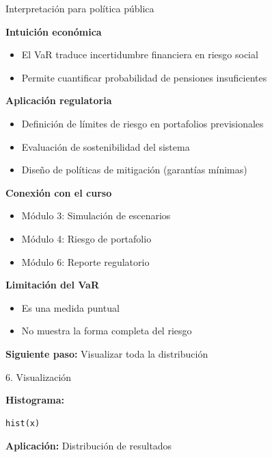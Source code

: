 \documentclass[10pt]{beamer}
\begin{document}
\begin{frame}{Interpretación para política pública}

\textbf{Intuición económica}

\begin{itemize}
\item El VaR traduce incertidumbre financiera en riesgo social
\item Permite cuantificar probabilidad de pensiones insuficientes
\end{itemize}

\vspace{0.4cm}

\textbf{Aplicación regulatoria}

\begin{itemize}
\item Definición de límites de riesgo en portafolios previsionales
\item Evaluación de sostenibilidad del sistema
\item Diseño de políticas de mitigación (garantías mínimas)
\end{itemize}

\vspace{0.4cm}

\textbf{Conexión con el curso}

\begin{itemize}
\item Módulo 3: Simulación de escenarios
\item Módulo 4: Riesgo de portafolio
\item Módulo 6: Reporte regulatorio
\end{itemize}

\textbf{Limitación del VaR}

\begin{itemize}
\item Es una medida puntual
\item No muestra la forma completa del riesgo
\end{itemize}

\vspace{0.3cm}

\textbf{Siguiente paso:}
Visualizar toda la distribución
\end{frame}
\begin{frame}[fragile]{6. Visualización}

\textbf{Histograma:}

\begin{verbatim}
hist(x)
\end{verbatim}

\vspace{0.3cm}

\textbf{Aplicación:}
Distribución de resultados

\end{frame}
\end{document}
